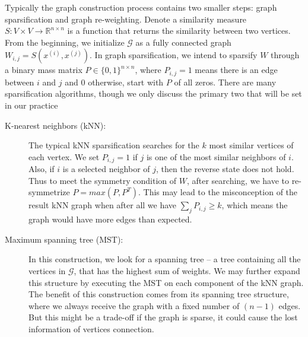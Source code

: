 Typically the graph construction process contains two smaller steps: graph sparsification and graph re-weighting. Denote a similarity measure $S: V\times V \rightarrow \mathbb{R}^{n\times n}$ is a function that returns the similarity between two vertices. From the beginning, we initialize $\mathcal{G}$ as a fully connected graph $W_{i,j} = S(x^{(i)}, x^{(j)})$. In graph sparsification, we intend to sparsify $W$ through a binary mass matrix $P \in \{0, 1\}^{n\times n}$, where $P_{i,j} = 1$ means there is an edge between $i$ and $j$ and $0$ otherwise, start with $P$ of all zeros. There are many sparsification algorithms, though we only discuss the primary two that will be set in our practice
\begin{description}
	\item[K-nearest neighbors (kNN):] The typical kNN sparsification searches for the $k$ most similar vertices of each vertex. We set $P_{i,j} = 1$ if $j$ is one of the most similar neighbors of $i$. Also, if $i$ is a selected neighbor of $j$, then the reverse state does not hold. Thus to meet the symmetry condition of $W$, after searching, we have to re-symmetrize $P = max(P, P^T)$. This may lead to the misconception of the result kNN graph when after all we have $\sum_{j}{P_{i,j}} \geq k$, which means the graph would have more edges than expected.
	
	 \item[Maximum spanning tree (MST):] In this construction, we look for a spanning tree -- a tree containing all the vertices in $\mathcal{G}$, that has the highest sum of weights. We may further expand this structure by executing the MST on each component of the kNN graph. The benefit of this construction comes from its spanning tree structure, where we always receive the graph with a fixed number of $(n-1)$ edges. But this might be a trade-off if the graph is sparse, it could cause the lost information of vertices connection.
\end{description}

